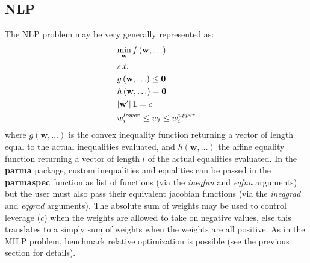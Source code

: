 \subsection{NLP}
The NLP problem may be very generally represented as:
\begin{equation}\label{nlp}
\begin{gathered}
  \mathop {\min }\limits_{\mathbf{w}} f\left( {{\mathbf{w}},\dots} \right) \hfill \\
  s.t. \hfill \\
  g\left( {{\mathbf{w}},\dots} \right) \leq {\mathbf{0}} \hfill \\
  h\left( {{\mathbf{w}},\dots} \right)={\mathbf{0}} \hfill \\
  \left| {\mathbf{w}'} \right|{\mathbf{1}}=c \hfill \\
  w_i^{lower} \leq {w_i} \leq w_i^{upper} \hfill \\
\end{gathered}
\end{equation}
where $g\left( {{\mathbf{w}},\dots} \right)$ is the convex inequality
function returning a vector of length equal to the actual inequalities
evaluated, and $h\left( {{\mathbf{w}},\dots} \right)$ the affine equality
function returning a vector of length $l$ of the actual equalities evaluated.
In the \textbf{parma} package, custom inequalities and equalities can be
passed in the \textbf{parmaspec} function as list of functions (via the
\emph{ineqfun} and \emph{eqfun} arguments) but the user must also pass their
equivalent jacobian functions (via the \emph{ineqgrad} and \emph{eqgrad}
arguments). The absolute sum of weights may be used to control leverage ($c$)
when the weights are allowed to take on negative values, else this translates
to a simply sum of weights when the weights are all positive. As in the MILP
problem, benchmark relative optimization is possible (see the previous section
for details).

